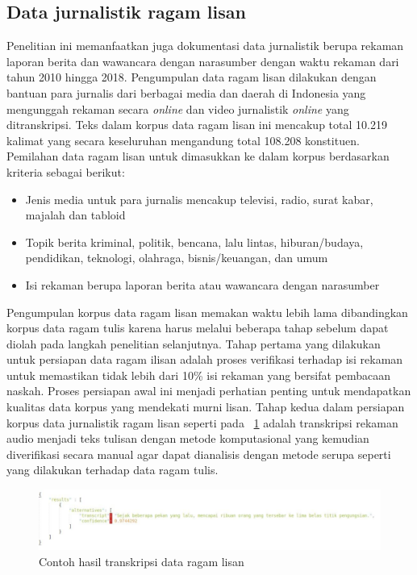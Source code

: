 \subsection{Data jurnalistik ragam lisan}
Penelitian ini memanfaatkan juga dokumentasi data jurnalistik berupa rekaman laporan berita dan wawancara dengan narasumber dengan waktu rekaman dari tahun 2010 hingga 2018. Pengumpulan data ragam lisan dilakukan dengan bantuan para jurnalis dari berbagai media dan daerah di Indonesia yang mengunggah rekaman secara \textit{online} dan video jurnalistik \textit{online} yang ditranskripsi. Teks dalam korpus data ragam lisan ini mencakup total 10.219 kalimat yang secara keseluruhan mengandung total 108.208 konstituen. Pemilahan data ragam lisan untuk dimasukkan ke dalam korpus berdasarkan kriteria sebagai berikut:

\begin{itemize}
	\item Jenis media untuk para jurnalis mencakup televisi, radio, surat kabar, majalah dan tabloid
	\item Topik berita kriminal, politik, bencana, lalu lintas, hiburan/budaya, pendidikan, teknologi, olahraga, bisnis/keuangan, dan umum
	\item Isi rekaman berupa laporan berita atau wawancara dengan narasumber
\end{itemize}

Pengumpulan korpus data ragam lisan memakan waktu lebih lama dibandingkan korpus data ragam tulis karena harus melalui beberapa tahap sebelum dapat diolah pada langkah penelitian selanjutnya. Tahap pertama yang dilakukan untuk persiapan data ragam ilisan adalah proses verifikasi terhadap isi rekaman untuk memastikan tidak lebih dari 10\% isi rekaman yang bersifat pembacaan naskah. Proses persiapan awal ini menjadi perhatian penting untuk mendapatkan kualitas data korpus yang mendekati murni lisan. Tahap kedua dalam persiapan korpus data jurnalistik ragam lisan seperti pada \pic~\ref{fig:contoh-transkripsi-lisan} adalah transkripsi rekaman audio menjadi teks tulisan dengan metode komputasional yang kemudian diverifikasi secara manual agar dapat dianalisis dengan metode serupa seperti yang dilakukan terhadap data ragam tulis. 

\begin{figure}
	\centering \includegraphics[width=1
	\textwidth] {pics/contoh-transkripsi-lisan.png} 
	\caption{Contoh hasil transkripsi data ragam lisan} 
	\label{fig:contoh-transkripsi-lisan} 
\end{figure}

